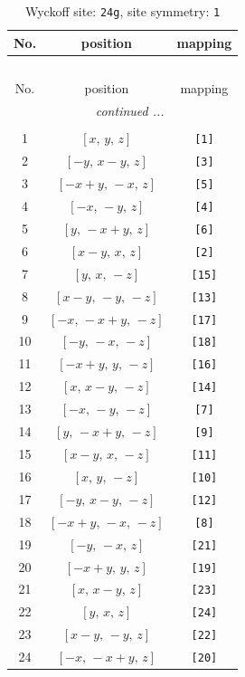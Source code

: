 \documentclass[fleqn,8pt]{jsarticle}
\begin{document}
\begin{longtable}{ccc}
\caption{Wyckoff site: {\tt 24g}, site symmetry: {\tt 1}}
 \\
 \hline \hline
No. & position & mapping \\ \hline \endfirsthead

\multicolumn{2}{l}{\tablename\ \thetable{}} \\
 \hline \hline
No. & position & mapping \\ \hline \endhead

 \hline \hline
\multicolumn{2}{r}{\footnotesize\it continued ...} \\ \endfoot

 \hline \hline
\multicolumn{2}{r}{} \\ \endlastfoot

1 & $\left[ x,\, y,\, z \right]$ & {\tt [1]} \\ \hline
2 & $\left[ - y,\, x - y,\, z \right]$ & {\tt [3]} \\ \hline
3 & $\left[ - x + y,\, - x,\, z \right]$ & {\tt [5]} \\ \hline
4 & $\left[ - x,\, - y,\, z \right]$ & {\tt [4]} \\ \hline
5 & $\left[ y,\, - x + y,\, z \right]$ & {\tt [6]} \\ \hline
6 & $\left[ x - y,\, x,\, z \right]$ & {\tt [2]} \\ \hline
7 & $\left[ y,\, x,\, - z \right]$ & {\tt [15]} \\ \hline
8 & $\left[ x - y,\, - y,\, - z \right]$ & {\tt [13]} \\ \hline
9 & $\left[ - x,\, - x + y,\, - z \right]$ & {\tt [17]} \\ \hline
10 & $\left[ - y,\, - x,\, - z \right]$ & {\tt [18]} \\ \hline
11 & $\left[ - x + y,\, y,\, - z \right]$ & {\tt [16]} \\ \hline
12 & $\left[ x,\, x - y,\, - z \right]$ & {\tt [14]} \\ \hline
13 & $\left[ - x,\, - y,\, - z \right]$ & {\tt [7]} \\ \hline
14 & $\left[ y,\, - x + y,\, - z \right]$ & {\tt [9]} \\ \hline
15 & $\left[ x - y,\, x,\, - z \right]$ & {\tt [11]} \\ \hline
16 & $\left[ x,\, y,\, - z \right]$ & {\tt [10]} \\ \hline
17 & $\left[ - y,\, x - y,\, - z \right]$ & {\tt [12]} \\ \hline
18 & $\left[ - x + y,\, - x,\, - z \right]$ & {\tt [8]} \\ \hline
19 & $\left[ - y,\, - x,\, z \right]$ & {\tt [21]} \\ \hline
20 & $\left[ - x + y,\, y,\, z \right]$ & {\tt [19]} \\ \hline
21 & $\left[ x,\, x - y,\, z \right]$ & {\tt [23]} \\ \hline
22 & $\left[ y,\, x,\, z \right]$ & {\tt [24]} \\ \hline
23 & $\left[ x - y,\, - y,\, z \right]$ & {\tt [22]} \\ \hline
24 & $\left[ - x,\, - x + y,\, z \right]$ & {\tt [20]} \\
\end{longtable}
\end{document}

